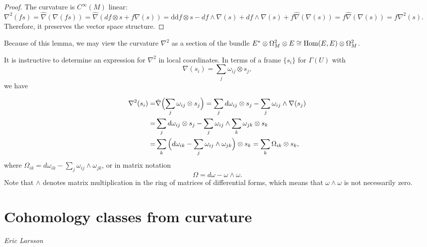 \documentclass[a4paper,openany]{scrbook}
\newcommand{\chapterauthor}[1]{\hfill\emph{#1}\par\noindent}
\begin{document}
\begin{proof} %
The curvature is $C^{\infty}(M)$ linear: $\nabla^2 (fs)=\hat{\nabla}(\nabla(fs))=\hat{\nabla}( d f\otimes s + f\nabla(s))=\mathrm{dd}f \otimes s -  d  f \wedge \nabla(s) +  d f\wedge \nabla(s) + f \hat{\nabla}(\nabla (s))=f\hat{\nabla}(\nabla(s))=f\nabla^2 (s)$. Therefore, it preserves the vector space structure.
\end{proof}

Because of this lemma, we may view the curvature $\nabla^2$ as a section of the bundle $E^* \otimes \Omega^2_M \otimes E \cong \operatorname{Hom}(E, E) \otimes \Omega^2_M$.

It is instructive to determine an expression for $\nabla^2$ in local coordinates. In terms of a frame $\{s_i\}$ for $\Gamma(U)$ with 
\[
\nabla(s_i)=\sum_j \omega_{ij} \otimes s_j,
\]
we have

\begin{align*}
\nabla^2(s_i) =& \hat{\nabla}\Bigl(\sum_j \omega_{ij} \otimes s_j\Bigr)
= \sum_j  d \omega_{ij} \otimes s_j - \sum_j \omega_{ij} \wedge \nabla(s_j) \\
=& \sum_j  d \omega_{ij} \otimes s_j - \sum_j \omega_{ij}\wedge \sum_k \omega_{jk} \otimes s_k \\
=& \sum_k \Big( d  \omega_{ik}  - \sum_j \omega_{ij} \wedge \omega_{jk} \Big)\otimes s_k
= \sum_k \Omega_{ik} \otimes s_k,
\end{align*} where $\Omega_{ik}= d \omega_{ik} - \sum_j \omega_{ij}\wedge \omega_{jk}$, or in matrix notation
\[
\Omega= d \omega - \omega \wedge \omega.
\] \label{curvature-matrix}
Note that $\wedge$ denotes matrix multiplication in the ring of matrices of differential forms, which means that $\omega \wedge \omega$ is not necessarily zero.




\section{Cohomology classes from curvature} \label{section-chern-curvature}
\chapterauthor{Eric Larsson}
\end{document}
